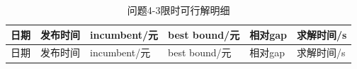 \documentclass[zihao=-4,a4paper,UTF8,fontset=none]{ctexart}
\begin{document}
\begingroup\renewcommand{\tablename}{附表}\renewcommand{\thetable}{A-10}

\begin{longtable}[]{@{}
  >{\centering\arraybackslash}p{}
  >{\centering\arraybackslash}p{}
  >{\centering\arraybackslash}p{}
  >{\centering\arraybackslash}p{}
  >{\centering\arraybackslash}p{}
  >{\centering\arraybackslash}p{}@{}}
\caption{问题4-3限时可行解明细}\label{tab:appendix-A-10}\tabularnewline
\toprule\noalign{}
\begin{minipage}[b]{\linewidth}\centering
日期
\end{minipage} & \begin{minipage}[b]{\linewidth}\centering
发布时间
\end{minipage} & \begin{minipage}[b]{\linewidth}\centering
incumbent/元
\end{minipage} & \begin{minipage}[b]{\linewidth}\centering
best bound/元
\end{minipage} & \begin{minipage}[b]{\linewidth}\centering
相对gap
\end{minipage} & \begin{minipage}[b]{\linewidth}\centering
求解时间/s
\end{minipage} \\
\midrule\noalign{}
\endfirsthead
\toprule\noalign{}
\begin{minipage}[b]{\linewidth}\centering
日期
\end{minipage} & \begin{minipage}[b]{\linewidth}\centering
发布时间
\end{minipage} & \begin{minipage}[b]{\linewidth}\centering
incumbent/元
\end{minipage} & \begin{minipage}[b]{\linewidth}\centering
best bound/元
\end{minipage} & \begin{minipage}[b]{\linewidth}\centering
相对gap
\end{minipage} & \begin{minipage}[b]{\linewidth}\centering
求解时间/s
\end{minipage} \\

\end{longtable}
\end{document}
